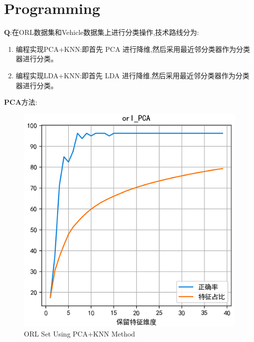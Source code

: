 \documentclass[homework]{IEEEtran}
\begin{document}
\section{Programming}
\begin{CJK}{UTF8}{gkai}

$\mathbf{Q}$:在ORL数据集和Vehicle数据集上进行分类操作,技术路线分为: \par
\begin{enumerate}
	\item 编程实现PCA+KNN:即首先 PCA 进行降维,然后采用最近邻分类器作为分类器进行分类。
	\item 编程实现LDA+KNN:即首先 LDA 进行降维,然后采用最近邻分类器作为分类器进行分类。
\end{enumerate}\par
$\mathbf{PCA}$方法:
\begin{figure}[htb]
    \centerline{\includegraphics{Images/fig1.png}}
    \caption{ORL Set Using PCA+KNN Method}
    \label{fig1}
    \end{figure}


\end{CJK}
\end{document}
